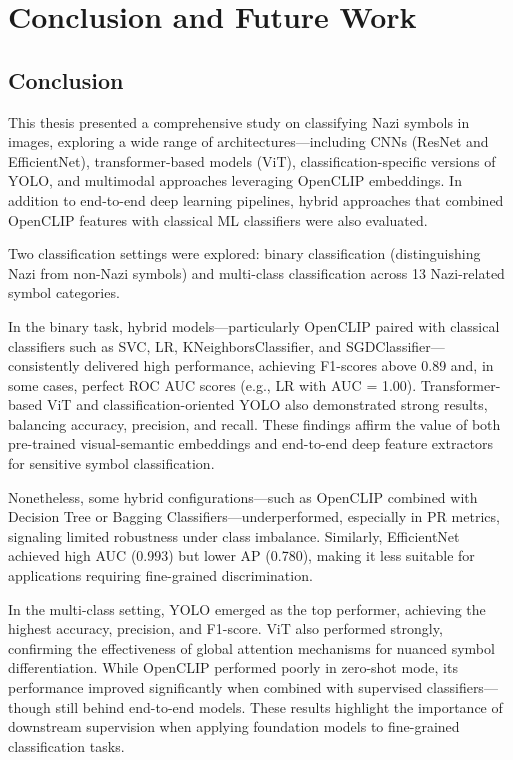 
\chapter{Conclusion and Future Work}\label{chapter:conclusion-and-future-work}

\section{Conclusion}

This thesis presented a comprehensive study on classifying Nazi symbols in images, exploring a wide range of
architectures—including \ac{CNN}s (ResNet and EfficientNet), transformer-based
models (\ac{ViT}), classification-specific versions of \ac{YOLO}, and multimodal approaches leveraging OpenCLIP
embeddings. In addition to end-to-end deep learning pipelines, hybrid approaches that combined OpenCLIP features
with classical \ac{ML} classifiers were also evaluated.

Two classification settings were explored: binary classification (distinguishing Nazi from non-Nazi symbols) and
multi-class classification across 13 Nazi-related symbol categories.

In the binary task, hybrid models—particularly OpenCLIP paired with classical classifiers such as \ac{SVC},
\ac{LR}, KNeighborsClassifier, and SGDClassifier—consistently delivered high performance, achieving F1-scores
above 0.89 and, in some cases, perfect \ac{ROC} \ac{AUC} scores (e.g., \ac{LR} with \ac{AUC} = 1.00). Transformer-based
\ac{ViT} and classification-oriented \ac{YOLO} also demonstrated strong results, balancing accuracy, precision,
and recall. These findings affirm the value of both pre-trained visual-semantic embeddings and end-to-end deep
feature extractors for sensitive symbol classification.

Nonetheless, some hybrid configurations—such as OpenCLIP combined with Decision Tree or Bagging Classifiers—underperformed,
especially in \ac{PR} metrics, signaling limited robustness under class imbalance. Similarly, EfficientNet
achieved high \ac{AUC} (0.993) but lower \ac{AP} (0.780), making it less suitable for applications
requiring fine-grained discrimination.

In the multi-class setting, \ac{YOLO} emerged as the top performer, achieving the highest accuracy, precision, and
F1-score. \ac{ViT} also performed strongly, confirming the effectiveness of global attention mechanisms for nuanced
symbol differentiation. While OpenCLIP performed poorly in zero-shot mode, its performance improved significantly
when combined with supervised classifiers—though still behind end-to-end models. These results highlight the
importance of downstream supervision when applying foundation models to fine-grained classification tasks.

